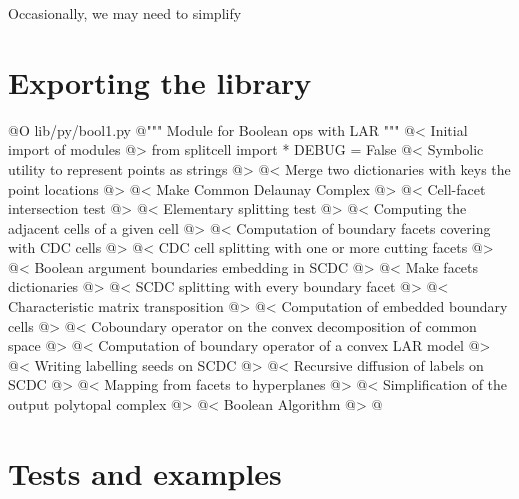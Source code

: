 \documentclass[11pt,oneside]{article}	%
\begin{document}
Occasionally, we may need to simplify 

\section{Exporting the library}


@O lib/py/bool1.py
@{""" Module for Boolean ops with LAR """
@< Initial import of modules @>
from splitcell import *
DEBUG = False
@< Symbolic utility to represent points as strings @>
@< Merge two dictionaries with keys the point locations @>
@< Make Common Delaunay Complex @>
@< Cell-facet intersection test @>
@< Elementary splitting test @>
@< Computing the adjacent cells of a given cell @>
@< Computation of boundary facets covering with CDC cells @>
@< CDC cell splitting with one or more cutting facets @>
@< Boolean argument boundaries embedding in SCDC @>
@< Make facets dictionaries @>
@< SCDC splitting with every boundary facet @>
@< Characteristic matrix transposition @>
@< Computation of embedded boundary cells @>
@< Coboundary operator on the convex decomposition of common space @>
@< Computation of boundary operator of a convex LAR model @>
@< Writing labelling seeds on SCDC @>
@< Recursive diffusion of labels on SCDC @>
@< Mapping from facets to hyperplanes @>
@< Simplification of the output polytopal complex @>
@< Boolean Algorithm @>
@}




\section{Tests and examples}
\end{document}

